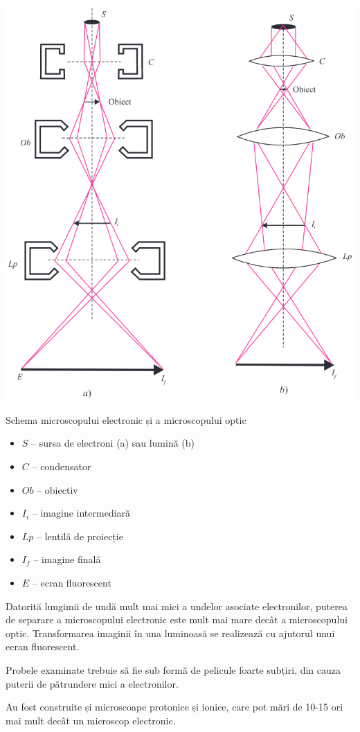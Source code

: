 \begin{minipage}{0.6\textwidth}
    \captionsetup{type=figure}
    \includegraphics[width=\textwidth]{fig/microscop}
    \caption{Schema microscopului electronic și a microscopului optic}
\end{minipage}%
\hspace{0.5cm}%
\begin{minipage}{0.3\textwidth}
    \begin{itemize}[left=0pt,label=]
        \item $S$ -- sursa de electroni (a) sau lumină (b)
        \item $C$ -- condensator
        \item $Ob$ -- obiectiv
        \item $I_i$ -- imagine intermediară
        \item $Lp$ -- lentilă de proiecție
        \item $I_f$ -- imagine finală
        \item $E$ -- ecran fluorescent
    \end{itemize}
\end{minipage}

\parbreak

Datorită lungimii de undă mult mai mici a undelor asociate electronilor,
puterea de separare a microscopului electronic este mult mai mare decât a
microscopului optic. Transformarea imaginii în una luminoasă se realizează cu
ajutorul unui ecran fluorescent.

Probele examinate trebuie să fie sub formă de pelicule foarte subțiri, din
cauza puterii de pătrundere mici a electronilor.

Au fost construite și microscoape protonice și ionice, care pot mări de 10-15
ori mai mult decât un microscop electronic.
